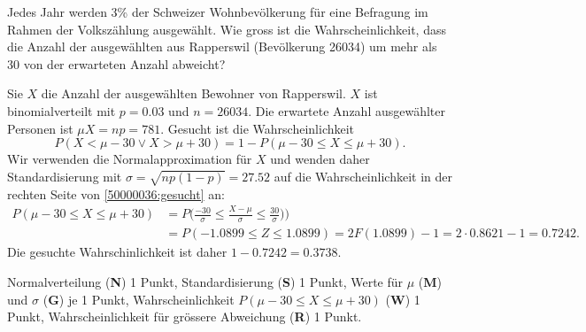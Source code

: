 Jedes Jahr werden 3\% der Schweizer Wohnbevölkerung für eine Befragung
im Rahmen der Volks\-zählung ausgewählt.
Wie gross ist die Wahrscheinlichkeit, dass die Anzahl der ausgewählten
aus Rapperswil (Bevölkerung 26034) um mehr als 30 von der erwarteten
Anzahl abweicht?


\begin{loesung}
Sie $X$ die Anzahl der ausgewählten Bewohner von Rapperswil.
$X$ ist binomialverteilt mit $p=0.03$ und $n=26034$.
Die erwartete Anzahl ausgewählter Personen ist $\mu X=np=781$.
Gesucht ist die Wahrscheinlichkeit
\begin{equation}
P(X < \mu - 30 \vee X > \mu + 30)
=
1-P(\mu - 30 \le X \le \mu + 30).
\label{50000036:gesucht}
\end{equation}
Wir verwenden die Normalapproximation für $X$ und wenden daher
Standardisierung mit $\sigma=\sqrt{np(1-p)}=27.52$ auf
die Wahrscheinlichkeit in der rechten Seite von
\eqref{50000036:gesucht}
an:
\begin{align*}
P(\mu - 30 \le X \le \mu + 30)
&=
P\biggl(
\frac{-30}{\sigma} \le \frac{X-\mu}{\sigma} \le \frac{30}{\sigma})
\biggr)
\\
&=
P(-1.0899 \le Z \le 1.0899)
=
2F(1.0899)-1
=
2\cdot 0.8621 - 1
=
0.7242.
\end{align*}
Die gesuchte Wahrschinlichkeit ist daher $1-0.7242= 0.3738$.
\end{loesung}

\begin{bewertung}
Normalverteilung ({\bf N}) 1 Punkt,
Standardisierung ({\bf S}) 1 Punkt,
Werte für $\mu$ ({\bf M}) und $\sigma$ ({\bf G}) je 1 Punkt,
Wahrscheinlichkeit $P(\mu-30\le X\le \mu+30)$ ({\bf W}) 1 Punkt,
Wahrscheinlichkeit für grössere Abweichung ({\bf R}) 1 Punkt.
\end{bewertung}
